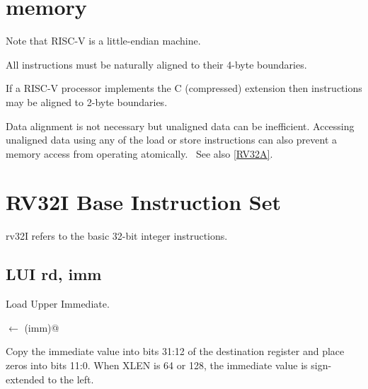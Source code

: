 \section{memory}

Note that RISC-V is a little-endian machine.  

All instructions must be naturally aligned to their 4-byte 
boundaries.~\cite[p.~5]{rvismv1v22:2017}

If a RISC-V processor implements the C (compressed) extension then 
instructions may be aligned to 2-byte 
boundaries.\cite[p.~68]{rvismv1v22:2017}

Data alignment is not necessary but unaligned data can be inefficient.  
Accessing unaligned data using any of the load or store instructions can 
also prevent a memory access from operating 
atomically.~\cite[p.19]{rvismv1v22:2017}  See also \autoref{RV32A}.



\section{RV32I Base Instruction Set}

%
\Gls{rv32}I refers to the basic 32-bit integer instructions.

\subsection{LUI rd, imm}

Load Upper Immediate.

\verb@rd@ $\leftarrow$ \verb@zr(imm)@

Copy the immediate value into bits 31:12 of the destination register and
place zeros into bits 11:0.
When XLEN is 64 or 128, the immediate value is sign-extended to the left.

